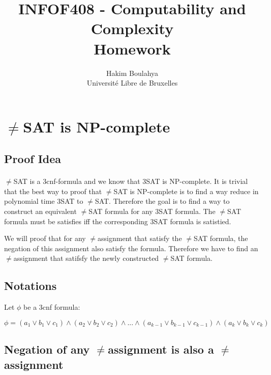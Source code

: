 \documentclass[letterpaper]{article}
\title{INFOF408 - Computability and Complexity \\
 \Large Homework}
\author{\Large Hakim Boulahya \\
Université Libre de Bruxelles
}
\begin{document}
\maketitle

\thispagestyle{firststyle}


\section{$\not=$SAT is NP-complete}


\subsection{Proof Idea}

\paragraph{}

$\not=$SAT is a 3cnf-formula and we know that 3SAT is NP-complete.
It is trivial that the best way to proof that  $\not=$SAT is NP-complete
is to find a way reduce in polynomial time 3SAT to $\not=$SAT. Therefore
the goal is to find a way to construct an equivalent $\not=$SAT formula
for any 3SAT formula.
The  $\not=$SAT formula must be satisfies iff the corresponding
3SAT formula is satistied.

We will proof that for any  $\not=$assignment that
satisfy the  $\not=$SAT formula, the negation of this assignment also satisfy
the formula. Therefore we have to find an  $\not=$assignment that satifsfy
the newly constructed  $\not=$SAT formula.

\subsection{Notations}


Let $\phi$ be a 3cnf formula:

$$
\phi = (a_1 \vee b_1 \vee c_1) \wedge (a_2 \vee b_2 \vee c_2)
\wedge ... \wedge
(a_{k-1} \vee b_{k-1} \vee c_{k-1}) \wedge (a_k \vee b_k \vee c_k)
$$



\subsection{Negation of any
$\not=$assignment is also a $\not=$assignment}
\label{neg}
\paragraph{}
\end{document}
